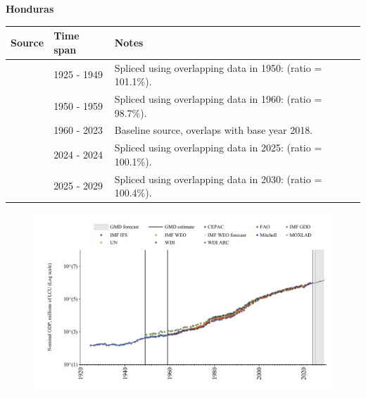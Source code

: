 \documentclass[12pt,a4paper,landscape]{article}
\begin{document}
\begin{adjustbox}{max totalsize={\paperwidth}{\paperheight},center}
\begin{minipage}[t][\textheight][t]{\textwidth}
\vspace*{0.5cm}
{}
\begin{center}
{\Large\bfseries Honduras}
\end{center}
\vspace{0.5cm}
\begin{table}[H]
\centering
\small
\begin{tabular}{|l|l|l|}
\hline
\textbf{Source} & \textbf{Time span} & \textbf{Notes} \\
\hline
\rowcolor{white}\cite{Mitchell}& 1925 - 1949 &Spliced using overlapping data in 1950: (ratio = 101.1\%).\\
\rowcolor{lightgray}\cite{CEPAC}& 1950 - 1959 &Spliced using overlapping data in 1960: (ratio = 98.7\%).\\
\rowcolor{white}\cite{WDI}& 1960 - 2023 &Baseline source, overlaps with base year 2018.\\
\rowcolor{lightgray}\cite{IMF_IFS}& 2024 - 2024 &Spliced using overlapping data in 2025: (ratio = 100.1\%).\\
\rowcolor{white}\cite{IMF_WEO_forecast}& 2025 - 2029 &Spliced using overlapping data in 2030: (ratio = 100.4\%).\\
\hline
\end{tabular}
\end{table}
\begin{figure}[H]
\centering
\includegraphics[width=\textwidth,height=0.6\textheight,keepaspectratio]{graphs/HND_nGDP.pdf}
\end{figure}
\end{minipage}
\end{adjustbox}
\end{document}
